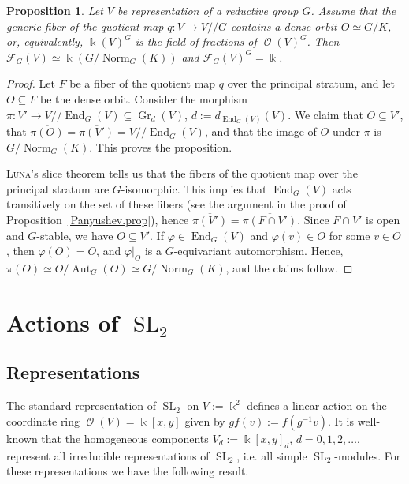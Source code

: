 \documentclass{amsart}
\newtheorem{prop}[thm]{Proposition}
\theoremstyle{definition}
\theoremstyle{remark}
\begin{document}
\begin{prop}\label{FGinvariantsAreTrivial.prop}
Let $V$ be representation of a reductive group $G$. Assume that the generic fiber of the quotient map $q\colon V \to V {/\!\!/} G$ contains a dense orbit $O\simeq G/K$, or, equivalently, ${\Bbbk}(V)^{G}$ is the field of fractions of $\operatorname{\mathcal O}(V)^{G}$.  Then ${\mathcal F}_{G}(V) \simeq {\Bbbk}(G/\operatorname{Norm}_{G}(K))$ and ${\mathcal F}_{G}(V)^{G}={\Bbbk}$.
\end{prop}
\begin{proof}
Let $F$ be a fiber of the quotient map $q$ over the principal stratum, and let $O {\subseteq} F$ be the dense orbit. Consider the morphism $\pi\colon V' \to V{/\!\!/}\operatorname{End}_{G}(V) {\subseteq} \operatorname{Gr}_{d}(V)$, $d:=d_{\operatorname{End}_{G}(V)}(V)$. We claim that $O{\subseteq} V'$, that $\overline{\pi(O)} = \overline{\pi(V')}=V{/\!\!/}\operatorname{End}_{G}(V)$, and that the image of $O$ under $\pi$ is $G/\operatorname{Norm}_{G}(K)$. This proves the proposition.

{\textsc{{Luna}\/}}'s slice theorem tells us that the fibers of the quotient map over the principal stratum are $G$-isomorphic. This implies that $\operatorname{End}_{G}(V)$ acts transitively on the set of these fibers (see the argument in the proof of Proposition~\ref{Panyushev.prop}), hence $\overline{\pi(V')} = \overline{\pi(F\cap V')}$. Since  $F\cap V'$ is open and $G$-stable, we have $O {\subseteq} V'$. If ${\varphi} \in \operatorname{End}_{G}(V)$ and ${\varphi}(v) \in O$ for some $v \in O$, then ${\varphi}(O) = O$, and ${\varphi}|_{O}$ is a $G$-equivariant automorphism. Hence, $\pi(O)\simeq O/\operatorname{Aut}_{G}(O) \simeq G/\operatorname{Norm}_{G}(K)$, and the claims follow.
\end{proof}

{\par\medskip}
\section{Actions of ${\operatorname{SL}_{2}}$}\label{SLtwo.sec}
\subsection{Representations}
The standard representation of ${\operatorname{SL}_{2}}$ on $V := {\Bbbk}^{2}$ defines a linear action on the coordinate ring $\operatorname{\mathcal O}(V) = {\Bbbk}[x,y]$ given by $gf(v):=f(g^{-1} v)$. It is well-known that the homogeneous components $V_{d}:={\Bbbk}[x,y]_{d}$, $d=0,1,2,\ldots$, represent all irreducible representations of ${\operatorname{SL}_{2}}$, i.e. all simple ${\operatorname{SL}_{2}}$-modules. For these representations we have the following result.
\end{document}
